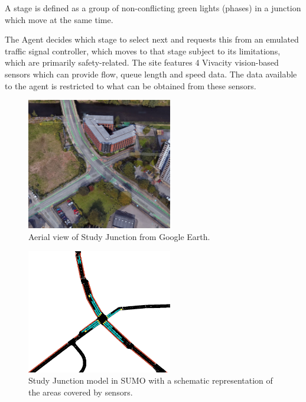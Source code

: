 \documentclass[conference]{IEEEtran}
\begin{document}
A stage is defined as a group of non-conflicting green lights (phases) in a junction which move at the same time.

The Agent decides which stage to select next and requests this from an emulated traffic signal controller, which moves to that stage subject to its limitations, which are primarily safety-related.
The site features 4 Vivacity vision-based sensors which can provide flow, queue length and speed data. The data available to the agent is restricted to what can be obtained from these sensors.
\begin{figure}                                                
\centering                                                    
\includegraphics[width=2.5in]{gmaps_iso_censored.jpg}                                    
\caption{Aerial view of Study Junction from Google Earth.}                                  
\label{intersection}                                               
\end{figure}     

\begin{figure}                                                
\centering                                                    
\includegraphics[width=2.5in]{intersection}                                    
\caption{Study Junction model in SUMO with a schematic representation of the areas covered by sensors.}                                  
\label{intersection}                                               
\end{figure}     
\end{document}
